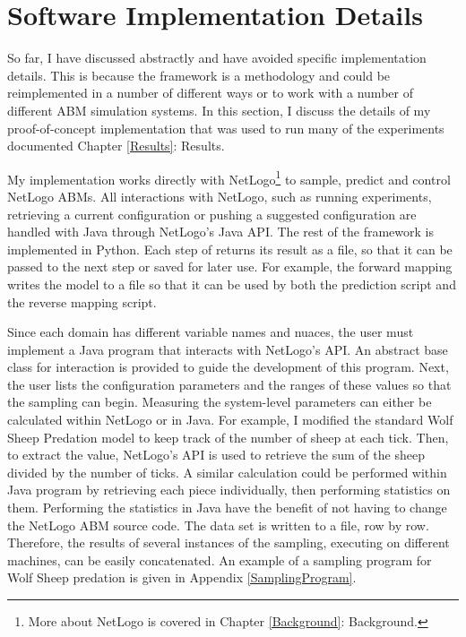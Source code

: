 \section{Software Implementation Details}
So far, I have discussed \fw abstractly and have avoided specific implementation details.
This is because the framework is a methodology and could be reimplemented in a number of different ways or to work with a number of different ABM simulation systems.
In this section, I discuss the details of my proof-of-concept implementation that was used to run many of the experiments documented Chapter \ref{Results}: Results.

My implementation works directly with NetLogo\footnote{More about NetLogo is covered in Chapter \ref{Background}: Background.} to sample, predict and control NetLogo ABMs.
All interactions with NetLogo, such as running experiments, retrieving a current configuration or pushing a suggested configuration are handled with Java through NetLogo's Java API.
The rest of the framework is implemented in Python.
Each step of \fw returns its result as a file, so that it can be passed to the next step or saved for later use.
For example, the forward mapping writes the model to a file so that it can be used by both the prediction script and the reverse mapping script.

Since each domain has different variable names and nuaces, the user must implement a Java program that interacts with NetLogo's API.
An abstract base class for interaction is provided to guide the development of this program.
Next, the user lists the configuration parameters and the ranges of these values so that the sampling can begin.
Measuring the system-level parameters can either be calculated within NetLogo or in Java.
For example, I modified the standard Wolf Sheep Predation model to keep track of the number of sheep at each tick.
Then, to extract the value, NetLogo's API is used to retrieve the sum of the sheep divided by the number of ticks.
A similar calculation could be performed within Java program by retrieving each piece individually, then performing statistics on them.
Performing the statistics in Java have the benefit of not having to change the NetLogo ABM source code.
The data set is written to a file, row by row.
Therefore, the results of several instances of the sampling, executing on different machines, can be easily concatenated.
An example of a sampling program for Wolf Sheep predation is given in Appendix \ref{SamplingProgram}.


